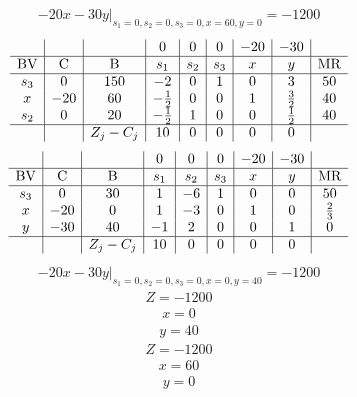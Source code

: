 \documentclass{article}
\begin{document}
\begin{align*}
\left.-20x - 30y\right|_{s_{1}=0,s_{2}=0,s_{3}=0,x=60,y=0}=-1200\end{align*}
\begin{align*}
\begin{array}{c|c|c|c|c|c|c|c|c}
 &  &  & 0 & 0 & 0 & -20 & -30 & \\
\hline
\text{BV} & \text{C} & \text{B} & s_{1} & s_{2} & s_{3} & x & y & \text{MR} \\
\hline
s_{3} & 0 & 150 & -2 & 0 & 1 & 0 & 3 & 50 \\
x & -20 & 60 & -\frac{1}{2} & 0 & 0 & 1 & \frac{3}{2} & 40 \\
s_{2} & 0 & 20 & -\frac{1}{2} & 1 & 0 & 0 & \frac{1}{2} & 40 \\
\hline
 &  & Z_j-C_j & 10 & 0 & 0 & 0 & 0 & \\
\end{array}
\end{align*}
\begin{align*}
\begin{array}{c|c|c|c|c|c|c|c|c}
 &  &  & 0 & 0 & 0 & -20 & -30 & \\
\hline
\text{BV} & \text{C} & \text{B} & s_{1} & s_{2} & s_{3} & x & y & \text{MR} \\
\hline
s_{3} & 0 & 30 & 1 & -6 & 1 & 0 & 0 & 50 \\
x & -20 & 0 & 1 & -3 & 0 & 1 & 0 & \frac{2}{3} \\
y & -30 & 40 & -1 & 2 & 0 & 0 & 1 & 0 \\
\hline
 &  & Z_j-C_j & 10 & 0 & 0 & 0 & 0 & \\
\end{array}
\end{align*}
\begin{align*}
\left.-20x - 30y\right|_{s_{1}=0,s_{2}=0,s_{3}=0,x=0,y=40}=-1200\end{align*}
\begin{align*}
Z=-1200\end{align*}
\begin{align*}
x=0\end{align*}
\begin{align*}
y=40\end{align*}
\begin{align*}
Z=-1200\end{align*}
\begin{align*}
x=60\end{align*}
\begin{align*}
y=0\end{align*}
\end{document}
